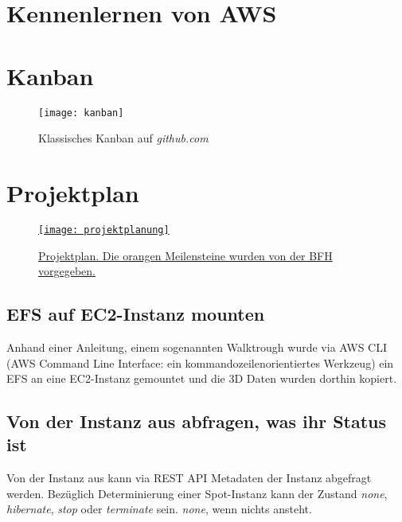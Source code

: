 \section{Kennenlernen von AWS}
\section{Kanban}\label{appendix:kanban}
\begin{figure}[H]
	\centering
	\texttt{[image: kanban]}
	\caption{Klassisches Kanban auf \emph{github.com}}
	\label{fig:Klassisches Kanban}
\end{figure}

\section{Projektplan}\label{appendix:projektplan}
\begin{figure}[H]
	\centering
	\href{https://docs.google.com/spreadsheets/d/1zKTZgt4BW736G0xRfU9o3vWYwAJj-8nzFvGsPR7yJ_0/edit?usp=sharing}{
	\texttt{[image: projektplanung]}}
	\caption{\href{https://docs.google.com/spreadsheets/d/1zKTZgt4BW736G0xRfU9o3vWYwAJj-8nzFvGsPR7yJ_0/edit?usp=sharing}{Projektplan. Die orangen Meilensteine wurden von der BFH vorgegeben.}}
	\label{fig:Projektplan}
\end{figure}

\subsection{EFS auf EC2-Instanz mounten}
Anhand einer Anleitung, einem sogenannten Walktrough wurde via AWS CLI (AWS Command Line Interface: ein kommandozeilenorientiertes Werkzeug) ein
EFS an eine EC2-Instanz gemountet und die 3D Daten wurden dorthin kopiert.

\subsection{Von der Instanz aus abfragen, was ihr Status ist}
Von der Instanz aus kann via REST API Metadaten der Instanz abgefragt werden. Bezüglich Determinierung einer Spot-Instanz kann der Zustand \emph{none}, \emph{hibernate}, \emph{stop} oder \emph{terminate} sein. \emph{none}, wenn nichts ansteht.

